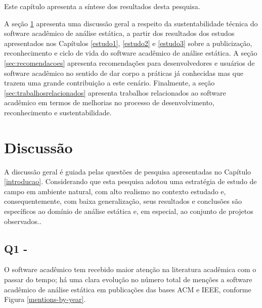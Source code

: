 \label{discussao}

Este capítulo apresenta 
a síntese dos resultados desta pesquisa.

A seção \ref{sec:discussao} apresenta 
uma discussão geral a respeito da
sustentabilidade técnica do software acadêmico de análise estática,
a partir dos resultados dos estudos apresentados nos Capítulos \ref{estudo1}, \ref{estudo2} e
\ref{estudo3} sobre a publicização, reconhecimento e ciclo de vida do software
acadêmico de análise estática.
A seção \ref{sec:recomendacoes} apresenta recomendações para desenvolvedores e usuários de software acadêmico no sentido de dar corpo a práticas já conhecidas mas que trazem uma grande contribuição a este cenário.
Finalmente, a seção \ref{sec:trabalhosrelacionados} apresenta trabalhos relacionados ao software acadêmico em termos de melhorias no processo de desenvolvimento, reconhecimento e sustentabilidade.

\section{Discussão}
\label{sec:discussao}

A discussão geral é guiada pelas questões de pesquisa apresentadas no
Capítulo \ref{introducao}.
Considerando que esta pesquisa adotou uma estratégia de 
estudo de campo em ambiente natural,
com alto realismo no contexto estudado e,
consequentemente, com baixa generalização,
seus resultados e conclusões são específicos 
ao domínio de análise estática e, em especial,
ao conjunto de projetos observados..

\subsection{Q1 - \QuestaoUm} %

O software acadêmico tem recebido maior atenção na literatura acadêmica com o
passar do tempo; há uma clara evolução no número total de menções a software
acadêmico de análise estática em publicações das bases ACM e IEEE, conforme
Figura \ref{mentions-by-year}.

